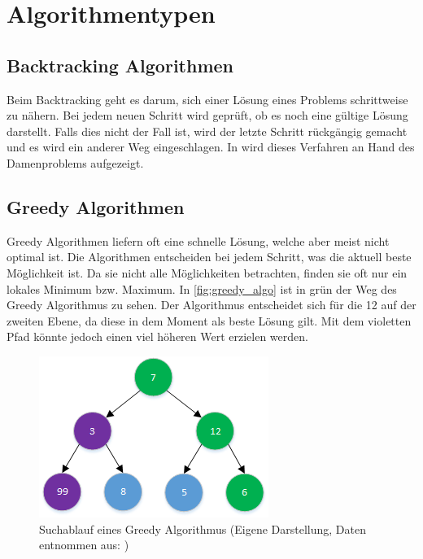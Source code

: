 \section{Algorithmentypen}\label{algo_types}

\subsection{Backtracking Algorithmen}\label{backtracking_algos}
Beim Backtracking geht es darum, sich einer Lösung eines Problems schrittweise zu nähern. Bei jedem neuen Schritt wird geprüft, ob es noch eine gültige Lösung darstellt. Falls dies nicht der Fall ist, wird der letzte Schritt rückgängig gemacht und es wird ein anderer Weg eingeschlagen. In \cite{backtracking} wird dieses Verfahren an Hand des Damenproblems aufgezeigt.

\subsection{Greedy Algorithmen}\label{greedy_algos}
Greedy Algorithmen liefern oft eine schnelle Lösung, welche aber meist nicht optimal ist. Die Algorithmen entscheiden bei jedem Schritt, was die aktuell beste Möglichkeit ist. Da sie nicht alle Möglichkeiten betrachten, finden sie oft nur ein lokales Minimum bzw. Maximum. In \autoref{fig:greedy_algo} ist in grün der Weg des Greedy Algorithmus zu sehen. Der Algorithmus entscheidet sich für die 12 auf der zweiten Ebene, da diese in dem Moment als beste Lösung gilt. Mit dem violetten Pfad könnte jedoch einen viel höheren Wert erzielen werden.

\begin{figure}[h]
\centering 
\includegraphics[scale=1]{images/einleitung/greedy_algo.png}
\caption[Suchablauf eines Greedy Algorithmus]{Suchablauf eines Greedy Algorithmus (Eigene Darstellung, Daten entnommen aus: \cite{pic_greedy_algo})}
\label{fig:greedy_algo}
\end{figure}

